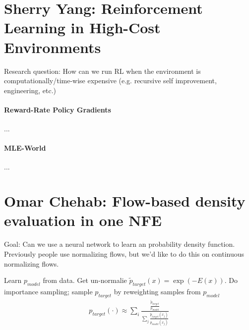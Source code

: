 \documentclass[11pt,fleqn]{article}
\numberwithin{equation}{section}
\theoremstyle{definition}
\theoremstyle{definition}
\begin{document}
 
 
\newpage
\section{Sherry Yang: Reinforcement Learning in High-Cost Environments}
Research question: How can we run RL when the environment is computationally/time-wise expensive (e.g. recursive self improvement, engineering, etc.)

\paragraph{Reward-Rate Policy Gradients}
...

\paragraph{MLE-World}
...


\newpage
\section{Omar Chehab: Flow-based density evaluation in one NFE}
Goal: Can we use a neural network to learn an probability density function. Previously people use normalizing flows, but we'd like to do this on continuous normalizing flows.

\begin{eg}
	Learn $p_{model}$ from data. Get un-normalie $\tilde p_{target}(x) = \exp(- E(x))$. Do importance sampling; sample $p_{target}$ by reweighting samples from $p_{model}$
	\begin{align}
		p_{target}
(\cdot) \approx \sum_{i} \frac{\frac{\tilde p_{target}}{p_{model}}}{\sum_{j}\frac{\tilde p_{target}(x_{j})}{p_{model}(x_j)}}
	\end{align}
\end{eg}
\end{document}
